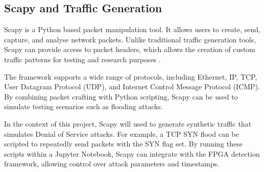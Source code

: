 \subsection{Scapy and Traffic Generation}
Scapy is a Python based packet manipulation tool. It allows users to create, send, capture, and analyse network packets. Unlike traditional traffic generation tools, Scapy can provide access to packet headers, which allows the creation of custom traffic patterns for testing and research purposes \cite{noauthor_scapy_nodate}.

The framework supports a wide range of protocols, including Ethernet, IP, TCP, User Datagram Protocol (UDP), and Internet Control Message Protocol (ICMP). By combining packet crafting with Python scripting, Scapy can be used to simulate testing scenarios such as flooding attacks.

In the context of this project, Scapy will used to generate synthetic traffic that simulates Denial of Service attacks. For example, a TCP SYN flood can be scripted to repeatedly send packets with the SYN flag set. By running these scripts within a Jupyter Notebook, Scapy can integrate with the FPGA detection framework, allowing control over attack parameters and timestamps.

